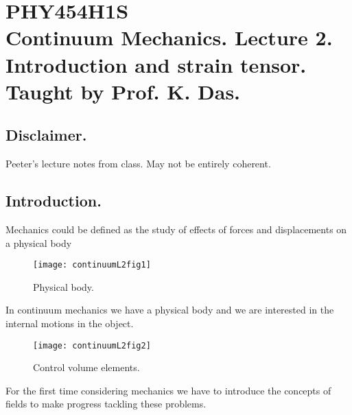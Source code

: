 
%

\chapter{PHY454H1S\\Continuum Mechanics.  Lecture 2.  Introduction and strain tensor.  Taught by Prof. K. Das.}
\label{chap:continuumL2}
{}
\date{Jan 13, 2012}

\beginArtWithToc

\section{Disclaimer.}

Peeter's lecture notes from class.  May not be entirely coherent.

\section{Introduction.}

Mechanics could be defined as the study of effects of forces and displacements on a physical body

\begin{figure}[htp]
   \centering
   \texttt{[image: continuumL2fig1]}
   \caption{Physical body.}\label{fig:continuumL2:continuumL2fig1}
\end{figure}

In continuum mechanics we have a physical body and we are interested in the internal motions in the object.  

\begin{figure}[htp]
   \centering
   \texttt{[image: continuumL2fig2]}
   \caption{Control volume elements.}\label{fig:continuumL2:continuumL2fig2}
\end{figure}

For the first time considering mechanics we have to introduce the concepts of fields to make progress tackling these problems.


